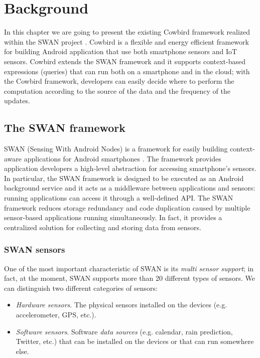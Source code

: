 \chapter{Background}

In this chapter we are going to present the existing Cowbird framework realized within the SWAN project \cite{swanonline}. Cowbird is a flexible and energy efficient framework for building Android application that use both smartphone sensors and IoT sensors\cite{cowbirdarticle}. Cowbird extends the SWAN framework \cite{swanphd} and it supports context-based expressions (queries) that can run both on a smartphone and in the cloud; with the Cowbird framework, developers can easily decide where to perform the computation according to the source of the data and the frequency of the updates.

\section{The SWAN framework}
SWAN (Sensing With Android Nodes) is a framework for easily building context-aware applications for Android smartphones \cite{swanphd}. The framework provides application developers a high-level abstraction for accessing smartphone's sensors. In particular, the SWAN framework is designed to be executed as an Android background service and it acts as a middleware between applications and sensors: running applications can access it through a well-defined API. The SWAN framework reduces storage redundancy and code duplication caused by multiple sensor-based applications running simultaneously. In fact, it provides a centralized solution for collecting and storing data from sensors. 

\subsection{SWAN sensors}
One of the most important characteristic of SWAN is its \emph{multi sensor support}; in fact, at the moment, SWAN supports more than 20 different types of sensors. We can distinguish two different categories of sensors:
\begin{itemize}
\item	 \emph{Hardware sensors}. The physical sensors installed on the devices (e.g. accelerometer, GPS, etc.).
\item \emph{Software sensors}. Software \emph{data sources} (e.g. calendar, rain prediction, Twitter, etc.) that can be installed on the devices or that can run somewhere else. 
\end{itemize}

